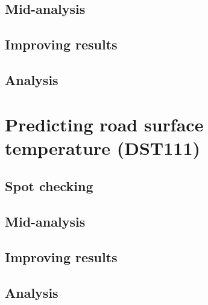 	\subsection{Mid-analysis}
	\subsection{Improving results}
	\subsection{Analysis}



\section{Predicting road surface temperature (DST111)}
	\subsection{Spot checking}
	\subsection{Mid-analysis}
	\subsection{Improving results}
	\subsection{Analysis}




